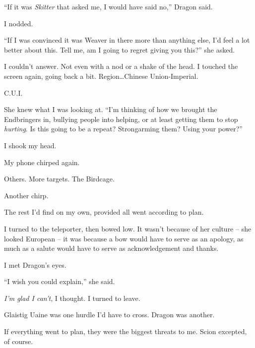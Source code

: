 ``If it was \emph{Skitter} that asked me, I would have said no,'' Dragon said.



I nodded.



``If I was convinced it was Weaver in there more than anything else, I'd feel a lot better about this.  Tell me, am I going to regret giving you this?'' she asked.



I couldn't answer.  Not even with a nod or a shake of the head.  I touched the screen again, going back a bit.  Region\ldots Chinese Union-Imperial.



C.U.I.



She knew what I was looking at.  ``I'm thinking of how we brought the Endbringers in, bullying people into helping, or at least getting them to stop \emph{hurting}.  Is this going to be a repeat?  Strongarming them?  Using your power?''



I shook my head.



My phone chirped again.



Others.  More targets.  The Birdcage.



Another chirp.



The rest I'd find on my own, provided all went according to plan.



I turned to the teleporter, then bowed low.  It wasn't because of her culture – she looked European – it was because a bow would have to serve as an apology, as much as a salute would have to serve as acknowledgement and thanks.



I met Dragon's eyes.



``I wish you could explain,'' she said.



\emph{I'm glad I can't}, I thought.  I turned to leave.



Glaistig Uaine was one hurdle I'd have to cross.  Dragon was another.



If everything went to plan, they were the biggest threats to me.  Scion excepted, of course.




